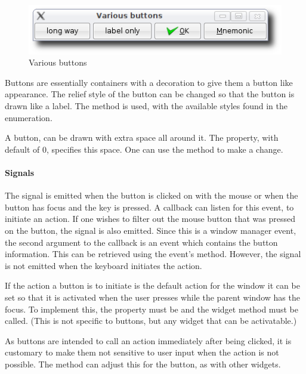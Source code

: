 \begin{figure}
  \centering
  \includegraphics[width=.8\textwidth]{RGtk2-various-button}
  \caption{Various buttons}
  \label{fig:RGtk2:various-buttons}
\end{figure}

Buttons are essentially containers with a decoration to give them a
button like appearance. The relief style of the button can be changed
so that the button is drawn like a label. The method
 is used, with the available styles
found in the  enumeration.

A button, can be drawn with extra space all around it. The
 property, with default of 0, specifies this space.
One can use the method  to make
a change.


\paragraph{Signals}
The  signal is emitted when the button is
clicked on with the mouse or when the button has focus and the
 key is pressed. A callback can listen for this event, to
initiate an action.  If one wishes to filter out the mouse
button that was pressed on the button, the  signal
is also emitted. Since this is a window manager event, the second
argument to the callback is an event which contains the button
information. This can be retrieved using the event's
 method. However, the
 signal is not emitted when the keyboard initiates
the action.

If the action a button is to initiate is the default action for the
window it can be set so that it is activated when the user presses
 while the parent window has the focus. To implement this,
the property  must be  and the widget
method  must be called. (This is not
specific to buttons, but any widget that can be activatable.)


As buttons are intended to call an action immediately after being
clicked, it is customary to make them not sensitive to user input when
the action is not possible. The 
method can adjust this for the button, as with other widgets.



